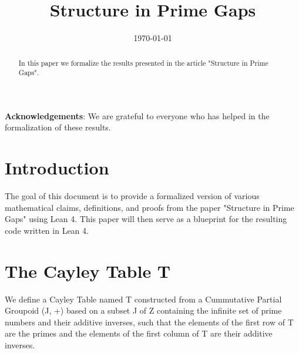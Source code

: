 %

\title{Structure in Prime Gaps}

\date{\today}

\begin{abstract}
In this paper we formalize the results presented in the article "Structure in Prime Gaps".
\end{abstract}

\maketitle

\tableofcontents

\textbf{Acknowledgements}: We are grateful to everyone who has helped in the formalization of these results. 

\chapter{Introduction}
The goal of this document is to provide a formalized version of various mathematical claims, definitions, and proofs from the paper "Structure in Prime Gaps" using Lean 4. This paper will then serve as a blueprint for the resulting code written in Lean 4.

\chapter{The Cayley Table T}

\begin{definition}
\label{Cayley-Table-T}
\leanok
{}
We define a Cayley Table named T constructed from a Cummutative Partial Groupoid (J, +) based on a subset J of Z         containing the infinite set of prime numbers and their additive inverses, such that the elements of the first row of T        are the primes and the elements of the first column of T are their additive inverses.
\end{definition}

